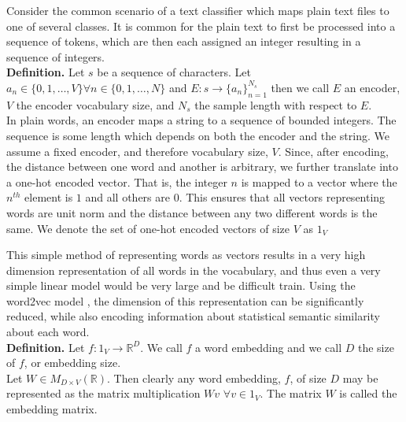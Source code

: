 Consider the common scenario of a text classifier which maps plain text files to one of several classes.  It is common for the plain text to first be processed into a sequence of tokens, which are then each assigned an integer resulting in a sequence of integers.\\

\noindent
\textbf{Definition.}
Let $s$ be a sequence of characters.  Let $a_n \in \{0,1,\dots,V\} \forall n \in \{0,1,\dots,N\}$ and $E:s\rightarrow \{a_n\}_{n=1}^{N_s}$ then we call $E$ an encoder, $V$ the encoder vocabulary size, and $N_s$ the sample length with respect to $E$.\\

\noindent
In plain words, an encoder maps a string to a sequence of bounded integers.  The sequence is some length which depends on both the encoder and the string.  We assume a fixed encoder, and therefore vocabulary size, $V$.  Since, after encoding, the distance between one word and another is arbitrary, we further translate into a one-hot encoded vector.  That is, the integer $n$ is mapped to a vector where the $n^{th}$ element is $1$ and all others are $0$.  This ensures that all vectors representing words are unit norm and the distance between any two different words is the same.  We denote the set of one-hot encoded vectors of size $V$ as $1_V$

This simple method of representing words as vectors results in a very high dimension representation of all words in the vocabulary, and thus even a very simple linear model would be very large and be difficult train.  Using the word2vec model \cite{tm13}, the dimension of this representation can be significantly reduced, while also encoding information about statistical semantic similarity about each word.\\

\noindent
\textbf{Definition.}
Let $f: 1_V \rightarrow \mathbb{R}^D$.  We call $f$ a word embedding and we call $D$ the size of $f$, or embedding size.  \\

\noindent
Let $W \in M_{D\times V}(\mathbb{R})$.  Then clearly any word embedding, $f$, of size $D$ may be represented as the matrix multiplication $Wv$ $\forall v \in 1_V$.  The matrix $W$ is called the embedding matrix.\\
